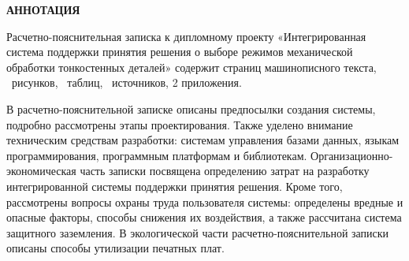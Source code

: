 \documentclass[14pt,oneside,final]{extreport}
\begin{document}
 	\begin{titlepage}
 		\begin{center}
 			\textbf{АННОТАЦИЯ}
 		\end{center}
 		
	Расчетно-пояснительная записка к дипломному проекту «Интегрированная система поддержки принятия решения о выборе режимов механической обработки тонкостенных деталей» содержит \pageref{LastPage} страниц машинописного текста, \totalfigures\ рисунков, \totaltables\ таблиц,  	\ источников, 2 приложения.
	
	В расчетно-пояснительной записке описаны предпосылки создания системы, подробно рассмотрены этапы проектирования. Также уделено внимание техническим средствам разработки: системам управления базами данных, языкам программирования, программным платформам и библиотекам. Организационно-экономическая часть записки посвящена определению затрат на разработку интегрированной системы поддержки принятия решения. Кроме того, рассмотрены вопросы охраны труда пользователя системы: определены вредные и опасные факторы, способы снижения их воздействия, а также рассчитана  система защитного заземления. В экологической части расчетно-пояснительной записки описаны способы утилизации печатных плат.

	\thispagestyle{empty}
 	\end{titlepage}
 
\end{document}
